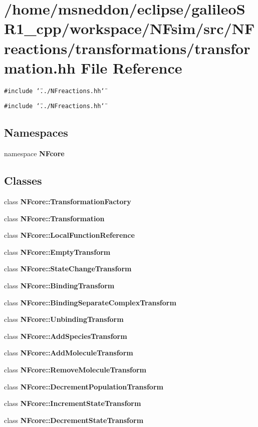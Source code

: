 \section{/home/msneddon/eclipse/galileoSR1\_\-cpp/workspace/NFsim/src/NFreactions/transformations/transformation.hh File Reference}
\label{transformation_8hh}


{\tt \#include \char`\"{}../NFreactions.hh\char`\"{}}\par
{\tt \#include \char`\"{}../NFreactions.hh\char`\"{}}\par
\subsection*{Namespaces}
\begin{CompactItemize}
\item 
namespace {\bf NFcore}
\end{CompactItemize}
\subsection*{Classes}
\begin{CompactItemize}
\item 
class {\bf NFcore::TransformationFactory}
\item 
class {\bf NFcore::Transformation}
\item 
class {\bf NFcore::LocalFunctionReference}
\item 
class {\bf NFcore::EmptyTransform}
\item 
class {\bf NFcore::StateChangeTransform}
\item 
class {\bf NFcore::BindingTransform}
\item 
class {\bf NFcore::BindingSeparateComplexTransform}
\item 
class {\bf NFcore::UnbindingTransform}
\item 
class {\bf NFcore::AddSpeciesTransform}
\item 
class {\bf NFcore::AddMoleculeTransform}
\item 
class {\bf NFcore::RemoveMoleculeTransform}
\item 
class {\bf NFcore::DecrementPopulationTransform}
\item 
class {\bf NFcore::IncrementStateTransform}
\item 
class {\bf NFcore::DecrementStateTransform}
\end{CompactItemize}
